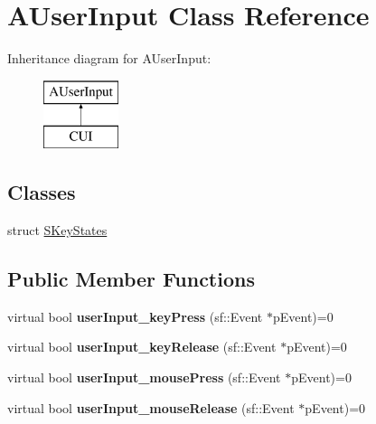 \hypertarget{classAUserInput}{\section{A\-User\-Input Class Reference}
\label{classAUserInput}
}
Inheritance diagram for A\-User\-Input\-:\begin{figure}[H]
\begin{center}
\leavevmode
\includegraphics[height=2.000000cm]{classAUserInput}
\end{center}
\end{figure}
\subsection*{Classes}
\begin{DoxyCompactItemize}
\item 
struct \hyperlink{structAUserInput_1_1SKeyStates}{S\-Key\-States}
\end{DoxyCompactItemize}
\subsection*{Public Member Functions}
\begin{DoxyCompactItemize}
\item 
\hypertarget{classAUserInput_a110239bcc0461666583d1dc940cb5d13}{virtual bool {\bfseries user\-Input\-\_\-key\-Press} (sf\-::\-Event $\ast$p\-Event)=0}\label{classAUserInput_a110239bcc0461666583d1dc940cb5d13}

\item 
\hypertarget{classAUserInput_afe8ae22fff673d788e366b9b29ffa67d}{virtual bool {\bfseries user\-Input\-\_\-key\-Release} (sf\-::\-Event $\ast$p\-Event)=0}\label{classAUserInput_afe8ae22fff673d788e366b9b29ffa67d}

\item 
\hypertarget{classAUserInput_a567e0d0610bd2ef2e23fed64b3e56d2b}{virtual bool {\bfseries user\-Input\-\_\-mouse\-Press} (sf\-::\-Event $\ast$p\-Event)=0}\label{classAUserInput_a567e0d0610bd2ef2e23fed64b3e56d2b}

\item 
\hypertarget{classAUserInput_a570f71dde4825c3e9bdcf6b58857f514}{virtual bool {\bfseries user\-Input\-\_\-mouse\-Release} (sf\-::\-Event $\ast$p\-Event)=0}\label{classAUserInput_a570f71dde4825c3e9bdcf6b58857f514}

\end{DoxyCompactItemize}
